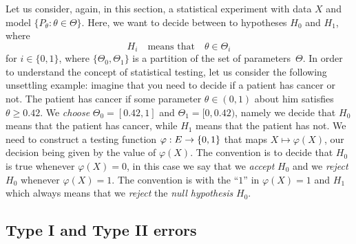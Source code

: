 Let us consider, again, in this section, a statistical experiment with data $X$ and model $\{ P_\theta : \theta \in \Theta \}$.
Here, we want to decide between to hypotheses $H_0$ and $H_1$, where
\begin{equation*}
	H_i \quad \text{means that} \quad \theta \in \Theta_i
\end{equation*}
for $i \in \{ 0, 1 \}$, where $\{ \Theta_0, \Theta_1 \}$ is a partition of the set of parameters~$\Theta$.
In order to understand the concept of statistical testing, let us consider the following unsettling example: imagine that you need to decide if a patient has cancer or not.
The patient has cancer if some parameter $\theta \in (0, 1)$ about him satisfies
$\theta \geq 0.42$.
We \emph{choose} $\Theta_0 = [0.42, 1]$ and $\Theta_1 = [0, 0.42)$, namely we decide that $H_0$ means that the patient has cancer, while $H_1$ means that the patient has not.
We need to construct a testing function $\varphi : E \rightarrow \{ 0, 1 \}$ that maps $X \mapsto \varphi(X)$, our decision being given by the value of $\varphi(X)$. 
The convention is to decide that $H_0$ is true whenever $\varphi(X) = 0$, in this case we say that we \emph{accept} $H_0$ and we \emph{reject} $H_0$ whenever $\varphi(X) = 1$.
The convention is with the ``$1$'' in $\varphi(X) = 1$ and $H_1$ which always means that we \emph{reject} the \emph{null hypothesis} $H_0$.

\subsection{Type I and Type II errors} %


